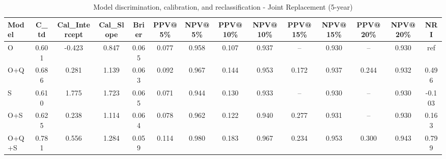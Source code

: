 \begin{table}[htbp]
\centering
\small
\caption{Model discrimination, calibration, and reclassification - Joint Replacement (5-year)}
\label{tab:perf_joint_5y}
\begin{tabular}{lccccccccccccc}
\toprule
Model & C\_td & Cal\_Intercept & Cal\_Slope & Brier & PPV@5\% & NPV@5\% & PPV@10\% & NPV@10\% & PPV@15\% & NPV@15\% & PPV@20\% & NPV@20\% & NRI \\
\midrule
O & 0.601 & -0.423 & 0.847 & 0.065 & 0.077 & 0.958 & 0.107 & 0.937 & -- & 0.930 & -- & 0.930 & ref \\
O+Q & 0.686 & 0.281 & 1.139 & 0.063 & 0.092 & 0.967 & 0.144 & 0.953 & 0.172 & 0.937 & 0.244 & 0.932 & 0.496 \\
S & 0.610 & 1.775 & 1.723 & 0.065 & 0.071 & 0.944 & 0.130 & 0.933 & -- & 0.930 & -- & 0.930 & -0.103 \\
O+S & 0.625 & 0.238 & 1.114 & 0.064 & 0.078 & 0.962 & 0.122 & 0.940 & 0.277 & 0.931 & -- & 0.930 & 0.163 \\
O+Q+S & 0.781 & 0.556 & 1.284 & 0.059 & 0.114 & 0.980 & 0.183 & 0.967 & 0.234 & 0.953 & 0.300 & 0.943 & 0.799 \\
\bottomrule
\end{tabular}
\end{table}